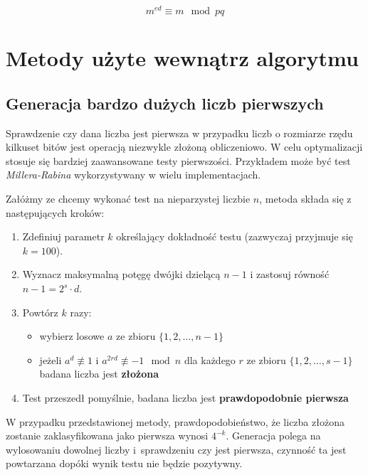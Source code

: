 \documentclass[10pt,a4paper]{article}
\begin{document}
\begin{equation}
m^{ed} \equiv m \mod pq
\end{equation}


\section{Metody użyte wewnątrz algorytmu}

\subsection{Generacja bardzo dużych liczb pierwszych}

Sprawdzenie czy dana liczba jest pierwsza w przypadku liczb o rozmiarze rzędu kilkuset bitów jest operacją niezwykle złożoną obliczeniowo. W celu optymalizacji stosuje się bardziej zaawansowane testy pierwszości. Przykładem może być test \textit{Millera-Rabina} wykorzystywany w wielu implementacjach.\\ 


\begin{samepage}
\noindent Załóżmy ze chcemy wykonać test na nieparzystej liczbie $n$, metoda składa się z następujących kroków:

\begin{enumerate}
\item Zdefiniuj parametr $k$ określający dokładność testu (zazwyczaj przyjmuje się $k=100$).
\item Wyznacz maksymalną potęgę dwójki dzielącą $n-1$ i zastosuj równość $n-1 = 2^s \cdot d$.
\item {Powtórz $k$ razy:
	\begin{itemize}
		\item wybierz losowe $a$ ze zbioru $\{1,2,\ldots,n-1\}$
		\item jeżeli $a^d \not\equiv 1$ i $a^{2rd} \not\equiv -1 \mod n$ dla każdego $r$ ze zbioru $\{1,2,\ldots,s-1\}$ badana liczba jest \textbf{złożona}
	\end{itemize}
	}
\item Test przeszedł pomyślnie, badana liczba jest \textbf{prawdopodobnie pierwsza}
\end{enumerate}

\end{samepage}

\noindent W przypadku przedstawionej metody, prawdopodobieństwo, że liczba złożona zostanie zaklasyfikowana jako pierwsza wynosi $4^{-k}$. Generacja polega na wylosowaniu dowolnej liczby i~sprawdzeniu czy jest pierwsza, czynność ta jest powtarzana dopóki wynik testu nie będzie pozytywny.
\end{document}
